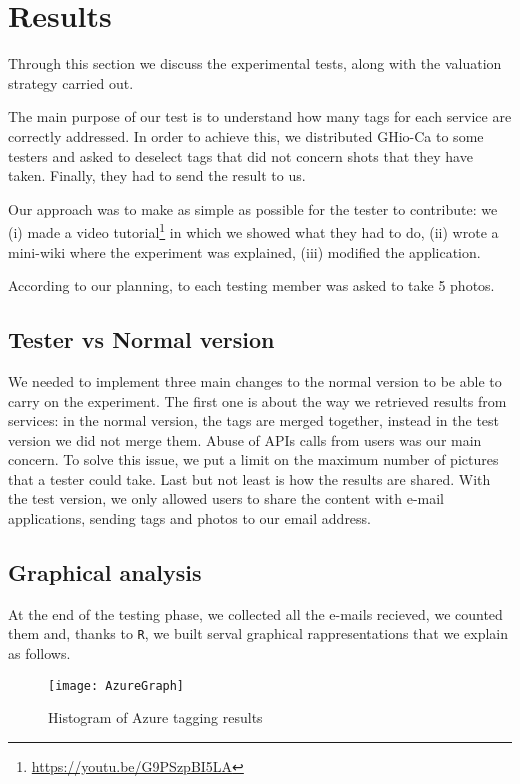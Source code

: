 \section{Results}
\label{sec:results}

Through this section we discuss the experimental tests, along with the valuation strategy carried out. 

The main purpose of our test is to understand how many tags for each service are correctly addressed. In order to achieve this, we distributed GHio-Ca to some testers and asked to deselect tags that did not concern shots that they have taken. Finally, they had to send the result to us.

Our approach was to make as simple as possible for the tester to contribute: we (i) made a video tutorial\footnote{\url{https://youtu.be/G9PSzpBI5LA}} in which we showed what they had to do, (ii) wrote a mini-wiki where the experiment was explained, (iii) modified the application. 

According to our planning, to each testing member was asked to take 5 photos.

\subsection{Tester vs Normal version}

We needed to implement three main changes to the normal version to be able to carry on the experiment. The first one is about the way we retrieved results from services: in the normal version, the tags are merged together, instead in the test version we did not merge them.
Abuse of APIs calls from users was our main concern. To solve this issue, we put a limit on the maximum number of pictures that a tester could take.
Last but not least is how the results are shared. With the test version, we only allowed users to share the content with e-mail applications, sending tags and photos to our email address.


\subsection{Graphical analysis}

At the end of the testing phase, we collected all the e-mails recieved, we counted them and, thanks to \texttt{R}, we built serval graphical rappresentations that we explain as follows.

\begin{figure}[H]
\centering
\texttt{[image: AzureGraph]}
\caption{Histogram of Azure tagging results}
\label{img:testgraphsazure}
\end{figure}

